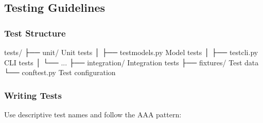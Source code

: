 \documentclass[letterpaper,10pt,english]{sphinxmanual}
\begin{document}
\subsection{Testing Guidelines}
\label{\detokenize{developer/contributing:testing-guidelines}}

\subsubsection{Test Structure}
\label{\detokenize{developer/contributing:test-structure}}
\begin{sphinxVerbatim}[commandchars=\\\{\}]
tests/
├── unit/                   \PYGZsh{} Unit tests
│   ├── test\PYGZus{}models.py      \PYGZsh{} Model tests
│   ├── test\PYGZus{}cli.py         \PYGZsh{} CLI tests
│   └── ...
├── integration/            \PYGZsh{} Integration tests
├── fixtures/               \PYGZsh{} Test data
└── conftest.py            \PYGZsh{} Test configuration
\end{sphinxVerbatim}


\subsubsection{Writing Tests}
\label{\detokenize{developer/contributing:writing-tests}}
\sphinxAtStartPar
Use descriptive test names and follow the AAA pattern:
\end{document}
